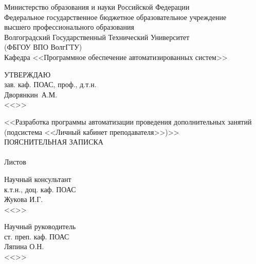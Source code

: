 \thispagestyle{empty}
\begin{center}
Министерство образования и науки Российской Федерации\\
Федеральное государственное бюджетное образовательное учреждение\\
 высшего профессионального образования\\
Волгоградский Государственный Технический Университет\\
(ФБГОУ ВПО ВолгГТУ) \\
Кафедра <<Программное обеспечение автоматизированных систем>>\\
\end{center}
\vfill
\flushright
\begin{minipage}[c]{15em}
УТВЕРЖДАЮ\\
зав. каф. ПОАС, проф., д.т.н.\\
\makebox[2cm]{\hrulefill}Дворянкин~А.М.\\
<<\makebox[1.5cm]{\hrulefill}>>\makebox[3.5cm]{\hrulefill}\the\year
\end{minipage}
\vspace{8mm}
\begin{center}
<<Разработка программы автоматизации проведения дополнительных занятий (подсистема <<Личный кабинет преподавателя>>)>>\\
\vspace{15mm}
ПОЯСНИТЕЛЬНАЯ ЗАПИСКА\\
\vspace{8mm}
\VSTUDocCode{}\\
\vspace{8mm}
Листов \totalpages\\
\vspace{15mm}
\end{center}
\flushleft\begin{minipage}[c]{15em}
Научный консультант\\
к.т.н., доц. каф. ПОАС\\
\makebox[2cm]{\hrulefill}Жукова И.Г.\\
<<\makebox[1.5cm]{\hrulefill}>>\makebox[3.5cm]{\hrulefill}\the\year
\end{minipage}
\hfill
\begin{minipage}[c]{15em}
Научный руководитель\\
ст. преп. каф. ПОАС\\
\makebox[2cm]{\hrulefill}Ляпина О.Н.\\
<<\makebox[1.5cm]{\hrulefill}>>\makebox[3.5cm]{\hrulefill}\the\year
\end{minipage}
\vspace{8mm}

